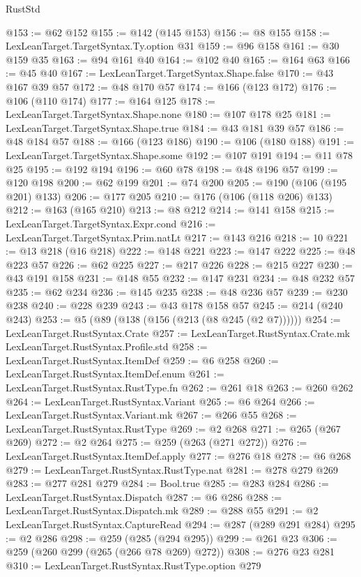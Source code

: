 \begin{lexlean}{RustStd}
\begin{coremodule}
@153 := @62 @152
@155 := @142 (@145 @153)
@156 := @8 @155
@158 := LexLeanTarget.TargetSyntax.Ty.option @31
@159 := @96 @158
@161 := @30 @159 @35
@163 := @94 @161 @40
@164 := @102 @40
@165 := @164 @63
@166 := @45 @40
@167 := LexLeanTarget.TargetSyntax.Shape.false
@170 := @43 @167 @39 @57
@172 := @48 @170 @57
@174 := @166 (@123 @172)
@176 := @106 (@110 @174)
@177 := @164 @125
@178 := LexLeanTarget.TargetSyntax.Shape.none
@180 := @107 @178 @25
@181 := LexLeanTarget.TargetSyntax.Shape.true
@184 := @43 @181 @39 @57
@186 := @48 @184 @57
@188 := @166 (@123 @186)
@190 := @106 (@180 @188)
@191 := LexLeanTarget.TargetSyntax.Shape.some
@192 := @107 @191
@194 := @11 @78 @25
@195 := @192 @194
@196 := @60 @78
@198 := @48 @196 @57
@199 := @120 @198
@200 := @62 @199
@201 := @74 @200
@205 := @190 (@106 (@195 @201) @133)
@206 := @177 @205
@210 := @176 (@106 (@118 @206) @133)
@212 := @163 (@165 @210)
@213 := @8 @212
@214 := @141 @158
@215 := LexLeanTarget.TargetSyntax.Expr.cond
@216 := LexLeanTarget.TargetSyntax.Prim.natLt
@217 := @143 @216
@218 := 10
@221 := @13 @218 (@16 @218)
@222 := @148 @221
@223 := @147 @222
@225 := @48 @223 @57
@226 := @62 @225
@227 := @217 @226
@228 := @215 @227
@230 := @43 @191 @158
@231 := @148 @55
@232 := @147 @231
@234 := @48 @232 @57
@235 := @62 @234
@236 := @145 @235
@238 := @48 @236 @57
@239 := @230 @238
@240 := @228 @239
@243 := @43 @178 @158 @57
@245 := @214 (@240 @243)
@253 := @5 (@89 (@138 (@156 (@213 (@8 @245 (@2 @7))))))
@254 := LexLeanTarget.RustSyntax.Crate
@257 := LexLeanTarget.RustSyntax.Crate.mk LexLeanTarget.RustSyntax.Profile.std
@258 := LexLeanTarget.RustSyntax.ItemDef
@259 := @6 @258
@260 := LexLeanTarget.RustSyntax.ItemDef.enum
@261 := LexLeanTarget.RustSyntax.RustType.fn
@262 := @261 @18
@263 := @260 @262
@264 := LexLeanTarget.RustSyntax.Variant
@265 := @6 @264
@266 := LexLeanTarget.RustSyntax.Variant.mk
@267 := @266 @55
@268 := LexLeanTarget.RustSyntax.RustType
@269 := @2 @268
@271 := @265 (@267 @269)
@272 := @2 @264
@275 := @259 (@263 (@271 @272))
@276 := LexLeanTarget.RustSyntax.ItemDef.apply
@277 := @276 @18
@278 := @6 @268
@279 := LexLeanTarget.RustSyntax.RustType.nat
@281 := @278 @279 @269
@283 := @277 @281 @279
@284 := Bool.true
@285 := @283 @284
@286 := LexLeanTarget.RustSyntax.Dispatch
@287 := @6 @286
@288 := LexLeanTarget.RustSyntax.Dispatch.mk
@289 := @288 @55
@291 := @2 LexLeanTarget.RustSyntax.CaptureRead
@294 := @287 (@289 @291 @284)
@295 := @2 @286
@298 := @259 (@285 (@294 @295))
@299 := @261 @23
@306 := @259 (@260 @299 (@265 (@266 @78 @269) @272))
@308 := @276 @23 @281
@310 := LexLeanTarget.RustSyntax.RustType.option @279

\end{coremodule}
\end{lexlean}

